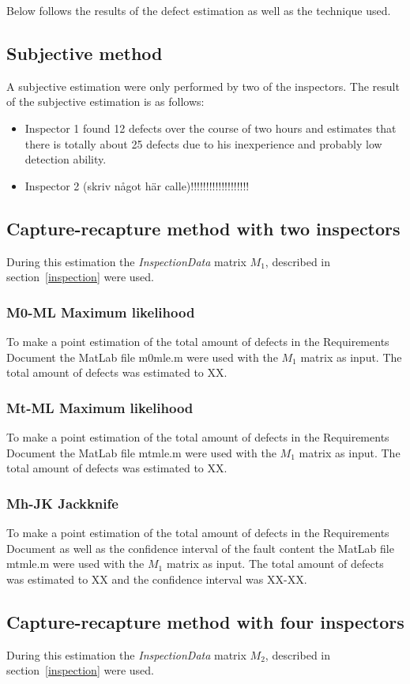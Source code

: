 Below follows the results of the defect estimation as well as the technique used.

\subsection{Subjective method}
A subjective estimation were only performed by two of the inspectors.
The result of the subjective estimation is as follows:
\begin{itemize}
\item Inspector 1 found 12 defects over the course of two hours and estimates that there is totally about 25 defects due to his inexperience and probably low detection ability.
\item Inspector 2 (skriv något här calle)!!!!!!!!!!!!!!!!!!!
\end{itemize}

\subsection{Capture-recapture method with two inspectors}
During this estimation the \textit{InspectionData} matrix $M_{1}$, described in section~\ref{inspection} were used.
\subsubsection{M0-ML Maximum likelihood}
To make a point estimation of the total amount of defects in the Requirements Document the MatLab file m0mle.m were used with the $M_{1}$ matrix as input. The total amount of defects was estimated to XX.
\subsubsection{Mt-ML Maximum likelihood}
To make a point estimation of the total amount of defects in the Requirements Document the MatLab file mtmle.m were used with the $M_{1}$ matrix as input. The total amount of defects was estimated to XX.
\subsubsection{Mh-JK Jackknife}
To make a point estimation of the total amount of defects in the Requirements Document as well as the confidence interval of the fault content the MatLab file mtmle.m were used with the $M_{1}$ matrix as input. The total amount of defects was estimated to XX and the confidence interval was XX-XX.

\subsection{Capture-recapture method with four inspectors}
During this estimation the \textit{InspectionData} matrix $M_{2}$, described in section~\ref{inspection} were used.
